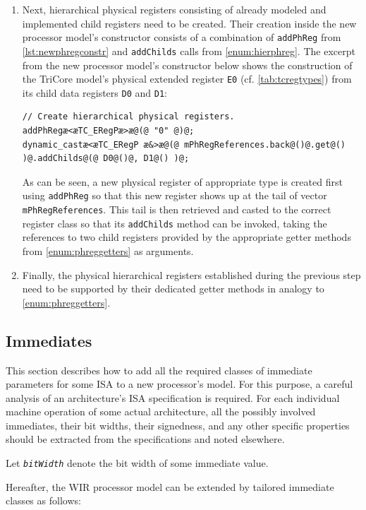 \begin{enumerate}[resume]
\begin{lstlisting}[style=code,float=!t,caption={Implementation of Access Methods for Physical Registers},label=lst:newphreggetimpl]
[...]
\end{lstlisting}

  \item Next, hierarchical physical registers consisting of already modeled and implemented child registers need to be created.
  Their creation inside the new processor model's constructor consists of a combination of \texttt{addPhReg} from \cref{lst:newphregconstr} and \texttt{addChilds} calls from \cref{enum:hierphreg}.
  The excerpt from the new processor model's constructor below shows the construction of the TriCore model's physical extended register \texttt{E0} (cf. \cref{tab:tcregtypes}) from its child data registers \texttt{D0} and \texttt{D1}:
\begin{lstlisting}[style=code,float=!h,xleftmargin=10mm,belowskip=-0.8 \baselineskip]
// Create hierarchical physical registers.
addPhRegæ<æTC_ERegPæ>æ@(@ "0" @)@;
dynamic_castæ<æTC_ERegP æ&>æ@(@ mPhRegReferences.back@()@.get@() )@.addChilds@(@ D0@()@, D1@() )@;
\end{lstlisting}

  As can be seen, a new physical register of appropriate type is created first using \texttt{addPhReg} so that this new register shows up at the tail of vector \texttt{mPhRegReferences}.
  This tail is then retrieved and casted to the correct register class so that its \texttt{addChilds} method can be invoked, taking the references to two child registers provided by the appropriate getter methods from \cref{enum:phreggetters} as arguments.

  \item Finally, the physical hierarchical registers established during the previous step need to be supported by their dedicated getter methods in analogy to \cref{enum:phreggetters}.
\end{enumerate}


\subsection{Immediates}
\label{ssec:newimmediates}

This section describes how to add all the required classes of immediate parameters for some \gls{ISA} to a new processor's model.
For this purpose, a careful analysis of an architecture's \gls{ISA} specification is required.
For each individual machine operation of some actual architecture, all the possibly involved immediates, their bit widths, their signedness, and any other specific properties should be extracted from the specifications and noted elsewhere.
\begin{wirNote}
Let \texttt{\itshape bitWidth} denote the bit width of some immediate value.
\end{wirNote}
Hereafter, the \gls{WIR} processor model can be extended by tailored immediate classes as follows:

